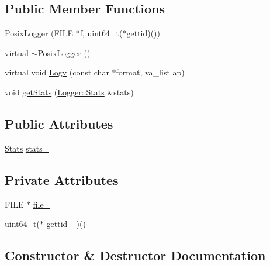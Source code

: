 \subsection*{Public Member Functions}
\begin{DoxyCompactItemize}
\item 
\hyperlink{classleveldb_1_1_posix_logger_a9c498babc43c3cfb5f863a252ce5d1d1}{Posix\+Logger} (F\+I\+L\+E $\ast$f, \hyperlink{stdint_8h_aaa5d1cd013383c889537491c3cfd9aad}{uint64\+\_\+t}($\ast$gettid)())
\item 
virtual \hyperlink{classleveldb_1_1_posix_logger_aa6fcbf43fa8feae2a9c25721b13b37ba}{$\sim$\+Posix\+Logger} ()
\item 
virtual void \hyperlink{classleveldb_1_1_posix_logger_ae7b521716a3e54c4be187806a81ccf6b}{Logv} (const char $\ast$format, va\+\_\+list ap)
\item 
void \hyperlink{classleveldb_1_1_posix_logger_a60ab2d49f2da7e846b95758d7a73396c}{get\+Stats} (\hyperlink{structleveldb_1_1_logger_1_1_stats}{Logger\+::\+Stats} \&stats)
\end{DoxyCompactItemize}
\subsection*{Public Attributes}
\begin{DoxyCompactItemize}
\item 
\hyperlink{structleveldb_1_1_posix_logger_1_1_stats}{Stats} \hyperlink{classleveldb_1_1_posix_logger_a6a2acfa406445a2713dce8a0b1db8424}{stats\+\_\+}
\end{DoxyCompactItemize}
\subsection*{Private Attributes}
\begin{DoxyCompactItemize}
\item 
F\+I\+L\+E $\ast$ \hyperlink{classleveldb_1_1_posix_logger_a7aee075e8c3eff4d15e1eb76fc111dbe}{file\+\_\+}
\item 
\hyperlink{stdint_8h_aaa5d1cd013383c889537491c3cfd9aad}{uint64\+\_\+t}($\ast$ \hyperlink{classleveldb_1_1_posix_logger_a50c5c46df09588931da4d640eb30d5d7}{gettid\+\_\+} )()
\end{DoxyCompactItemize}


\subsection{Constructor \& Destructor Documentation}
\hypertarget{classleveldb_1_1_posix_logger_a9c498babc43c3cfb5f863a252ce5d1d1}{}
